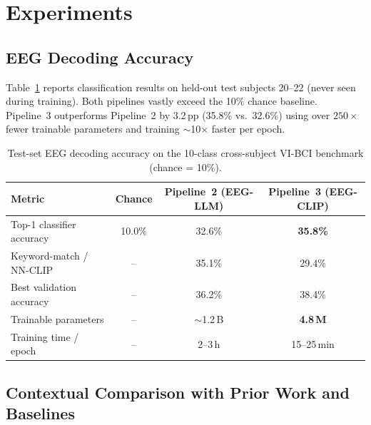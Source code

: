 \documentclass{article}
\begin{document}
\section{Experiments}
\label{sec:experiments}

\subsection{EEG Decoding Accuracy}

Table~\ref{tab:accuracy} reports classification results on held-out test subjects 20--22 (never seen during training). Both pipelines vastly exceed the 10\% chance baseline. Pipeline~3 outperforms Pipeline~2 by 3.2\,pp (35.8\% vs.\ 32.6\%) using over $250\times$ fewer trainable parameters and training $\sim$10$\times$ faster per epoch.

\begin{table}[h]
  \centering
  \caption{Test-set EEG decoding accuracy on the 10-class cross-subject VI-BCI benchmark (chance = 10\%).}
  \label{tab:accuracy}
  \small
  \begin{tabular}{lccc}
    \toprule
    \textbf{Metric} & \textbf{Chance} & \textbf{Pipeline~2 (EEG-LLM)} & \textbf{Pipeline~3 (EEG-CLIP)} \\
    \midrule
    Top-1 classifier accuracy      & 10.0\% & 32.6\%              & \textbf{35.8\%} \\
    Keyword-match / NN-CLIP        & --     & 35.1\%              & 29.4\% \\
    Best validation accuracy       & --     & 36.2\%              & 38.4\% \\
    Trainable parameters           & --     & $\sim$1.2\,B        & \textbf{4.8\,M} \\
    Training time / epoch          & --     & 2--3\,h             & 15--25\,min \\
    \bottomrule
  \end{tabular}
\end{table}

\subsection{Contextual Comparison with Prior Work and Baselines}
\label{sec:context}
\end{document}
